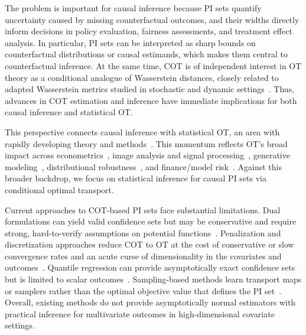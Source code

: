 \documentclass{article}
\theoremstyle{plain}
\theoremstyle{definition}
\theoremstyle{plain}
\begin{document}
The problem is important for causal inference because PI sets quantify uncertainty caused by missing counterfactual outcomes, and their widths directly inform decisions in policy evaluation, fairness assessments, and treatment effect analysis. 
In particular, PI sets can be interpreted as sharp bounds on counterfactual distributions or causal estimands, which makes them central to counterfactual inference.
At the same time, COT is of independent interest in OT theory as a conditional analogue of Wasserstein distances, closely related to adapted Wasserstein metrics studied in stochastic and dynamic settings~\parencite{backhoff2022estimating}. 
Thus, advances in COT estimation and inference have immediate implications for both causal inference and statistical OT.

This perspective connects causal inference with statistical OT, an area with rapidly developing theory and methods~\parencite{villani2009optimal, panaretos2019statistical,niles2022minimax,HutterRigollet2021MinimaxOT,manole2024plugin,hundrieser2022unifying}.
This momentum reflects OT's broad impact across econometrics~\parencite{galichon2018optimal}, image analysis and signal processing~\parencite{rubner2000earth,basu2014detecting,kolouri2017optimal}, generative modeling~\parencite{arjovsky2017wasserstein,genevay2018learning,gulrajani2017improved,wang2023efficient}, distributional robustness~\parencite{mohajerin2018data,kuhn2019wasserstein,blanchet2019quantifying}, and finance/model risk~\parencite{xu2020cot,nguyen2021robustifying,backhoff2022estimating}.
Against this broader backdrop, we focus on statistical inference for causal PI sets via conditional optimal transport.

Current approaches to COT-based PI sets face substantial limitations. 
Dual formulations can yield valid confidence sets but may be conservative and require strong, hard-to-verify assumptions on potential functions~\parencite{ji2023model,al2025error}. 
Penalization and discretization approaches reduce COT to OT at the cost of conservative or slow convergence rates and an acute curse of dimensionality in the covariates and outcomes~\parencite{manupriya2024consistent,lin2025tightening,lin2025estimation}. 
Quantile regression can provide asymptotically exact confidence sets but is limited to scalar outcomes~\parencite{fan2010sharp}. 
Sampling-based methods learn transport maps or samplers rather than the optimal objective value that defines the PI set~\parencite{hosseini2025conditional}. 
Overall, existing methods do not provide asymptotically normal estimators with practical inference for multivariate outcomes in high-dimensional covariate settings.
\end{document}

